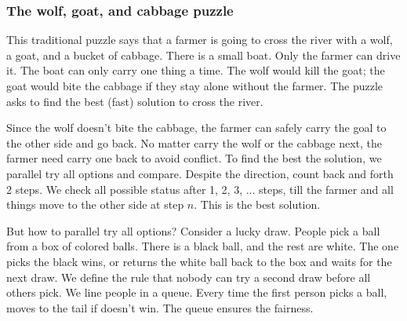 \documentclass[b5paper]{article}
\begin{document}
\begin{Exercise}\label{ex:leap-frog}
\end{Exercise}

\begin{Answer}[ref = {ex:leap-frog}]
\end{Answer}

\subsubsection{The wolf, goat, and cabbage puzzle}

This traditional puzzle says that a farmer is going to cross the river with a wolf, a goat, and a bucket of cabbage. There is a small boat. Only the farmer can drive it. The boat can only carry one thing a time. The wolf would kill the goat; the goat would bite the cabbage if they stay alone without the farmer. The puzzle asks to find the best (fast) solution to cross the river.

Since the wolf doesn't bite the cabbage, the farmer can safely carry the goal to the other side and go back. No matter carry the wolf or the cabbage next, the farmer need carry one back to avoid conflict. To find the best the solution, we parallel try all options and compare. Despite the direction, count back and forth 2 steps. We check all possible status after 1, 2, 3, ... steps, till the farmer and all things move to the other side at step $n$. This is the best solution.

But how to parallel try all options? Consider a lucky draw. People pick a ball from a box of colored balls. There is a black ball, and the rest are white. The one picks the black wins, or returns the white ball back to the box and waits for the next draw. We define the rule that nobody can try a second draw before all others pick. We line people in a queue. Every time the first person picks a ball, moves to the tail if doesn't win. The queue ensures the fairness.
\end{document}
